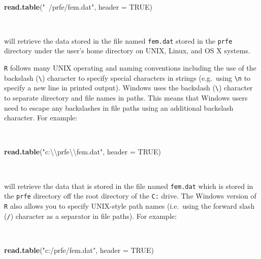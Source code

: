 \documentclass[12pt,a4paper]{book}
\newenvironment{Shaded}{\begin{snugshade}}{\end{snugshade}}
\newcommand{\CharTok}[1]{\textcolor[rgb]{0.31,0.60,0.02}{#1}}
\newcommand{\DataTypeTok}[1]{\textcolor[rgb]{0.13,0.29,0.53}{#1}}
\newcommand{\KeywordTok}[1]{\textcolor[rgb]{0.13,0.29,0.53}{\textbf{#1}}}
\newcommand{\NormalTok}[1]{#1}
\newcommand{\OtherTok}[1]{\textcolor[rgb]{0.56,0.35,0.01}{#1}}
\newcommand{\StringTok}[1]{\textcolor[rgb]{0.31,0.60,0.02}{#1}}
\theoremstyle{definition}
\theoremstyle{definition}
\theoremstyle{definition}
\theoremstyle{remark}
\begin{document}
~

\begin{Shaded}
\begin{Highlighting}[]
\KeywordTok{read.table}\NormalTok{(}\StringTok{"~/prfe/fem.dat"}\NormalTok{, }\DataTypeTok{header =} \OtherTok{TRUE}\NormalTok{)}
\end{Highlighting}
\end{Shaded}

~

will retrieve the data stored in the file named \texttt{fem.dat} stored
in the \texttt{prfe} directory under the user's home directory on UNIX,
Linux, and OS X systems.

\texttt{R} follows many UNIX operating and naming conventions including
the use of the backslash (\texttt{\textbackslash{}}) character to
specify special characters in strings (e.g.~using
\texttt{\textbackslash{}n} to specify a new line in printed output).
Windows uses the backslash (\texttt{\textbackslash{}}) character to
separate directory and file names in paths. This means that Windows
users need to escape any backslashes in file paths using an additional
backslash character. For example:

~

\begin{Shaded}
\begin{Highlighting}[]
\KeywordTok{read.table}\NormalTok{(}\StringTok{"c:}\CharTok{\textbackslash{}\textbackslash{}}\StringTok{prfe}\CharTok{\textbackslash{}\textbackslash{}}\StringTok{fem.dat"}\NormalTok{, }\DataTypeTok{header =} \OtherTok{TRUE}\NormalTok{)}
\end{Highlighting}
\end{Shaded}

~

will retrieve the data that is stored in the file named \texttt{fem.dat}
which is stored in the \texttt{prfe} directory off the root directory of
the \texttt{C:} drive. The Windows version of \texttt{R} also allows you
to specify UNIX-style path names (i.e.~using the forward slash
(\texttt{/}) character as a separator in file paths). For example:

~

\begin{Shaded}
\begin{Highlighting}[]
\KeywordTok{read.table}\NormalTok{(}\StringTok{"c:/prfe/fem.dat"}\NormalTok{, }\DataTypeTok{header =} \OtherTok{TRUE}\NormalTok{)}
\end{Highlighting}
\end{Shaded}
\end{document}
